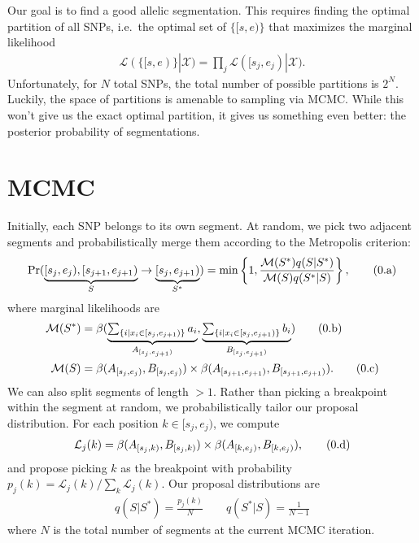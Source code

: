 \documentclass[10pt,letter]{article}
\numberwithin{equation}{section}
\newcommand{\rt}{\right}
\newcommand{\lt}{\left}
\newcommand{\btag}[1]{\addtocounter{equation}{1}\label{#1}\tag{\arabic{section}.\alph{equation}}}
\newcommand{\textop}[1]{\operatorname{#1}}
\begin{document}
Our goal is to find a good allelic segmentation. This requires finding the optimal partition of all SNPs, i.e.\ the optimal set of $\{[s,e)\}$ that maximizes the marginal likelihood
\begin{align*}
\mathcal{L}(\{[s,e)\}|\mathcal{X})=\prod_j \mathcal{L}([s_j,e_j)|\mathcal{X}).
\end{align*}
Unfortunately, for $N$ total SNPs, the total number of possible partitions is $2^N$. Luckily, the space of partitions is amenable to sampling via MCMC. While this won't give us the exact optimal partition, it gives us something even better: the posterior probability of segmentations.

\section{MCMC}

Initially, each SNP belongs to its own segment. At random, we pick two adjacent segments and probabilistically merge them according to the Metropolis criterion:
\begin{align*}
\textop{Pr}(\underbrace{[s_j,e_j),[s_{j+1},e_{j+1})}_{S}\to \underbrace{[s_j,e_{j+1})}_{S^\ast}) = \min\lt\{1,\frac{\mathcal{M}(S^\ast)q(S|S^\ast)}{\mathcal{M}(S)q(S^\ast|S)}\rt\},\btag{metro}
\end{align*}
where marginal likelihoods are
\begin{align*}
\mathcal{M}(S^\ast) &= \beta(\underbrace{\textstyle\sum_{\{i|x_i\in [s_j, e_{j+1})\}}a_i}_{A_{[s_j,e_{j+1})}},\underbrace{\textstyle\sum_{\{i|x_i\in [s_j, e_{j+1})\}}b_i}_{B_{[s_j,e_{j+1})}})\btag{psum_1}\\
\mathcal{M}(S) &= \beta(A_{[s_j,e_j)},B_{[s_j,e_j)})\times \beta(A_{[s_{j+1},e_{j+1})},B_{[s_{j+1},e_{j+1})}).\btag{psum_2}
\end{align*}
We can also split segments of length $>1$. Rather than picking a breakpoint within the segment at random, we probabilistically tailor our proposal distribution. For each position $k\in [s_j,e_j)$, we compute
\begin{align*}
\mathcal{L}_j(k) = \beta(A_{[s_j,k)},B_{[s_j,k)})\times\beta(A_{[k,e_j)},B_{[k,e_j)}),\btag{psum_3}
\end{align*}
and propose picking $k$ as the breakpoint with probability $p_j(k)=\mathcal{L}_j(k)/\sum_k \mathcal{L}_j(k)$. Our proposal distributions are
\begin{align*}
q(S|S^\ast) = \frac{p_j(k)}{N} \qquad q(S^\ast|S) = \frac{1}{N-1}
\end{align*}
where $N$ is the total number of segments at the current MCMC iteration.
\end{document}

